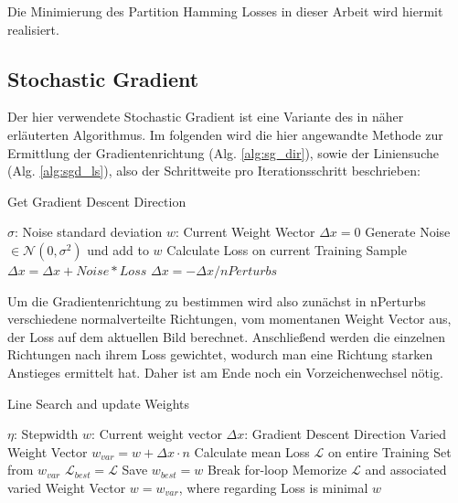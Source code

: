 Die Minimierung des Partition Hamming Losses in dieser Arbeit wird hiermit realisiert.

\subsection{Stochastic Gradient}

Der hier verwendete Stochastic Gradient ist eine Variante des in \cite{NowozinStrucLearn11} näher erläuterten Algorithmus. Im folgenden wird die hier angewandte Methode zur Ermittlung der Gradientenrichtung (Alg. \ref{alg:sg_dir}), sowie der Liniensuche (Alg. \ref{alg:sgd_ls}), also der Schrittweite pro Iterationsschritt beschrieben: \\

\begin{algorithm}
\caption{Get Gradient Descent Direction}\label{alg:sg_dir}
\begin{algorithmic}[1]
	\State $\sigma$: Noise standard deviation
	\State $w$: Current Weight Wector
	\State
	\State $\Delta x = 0$
		\State Generate Noise $\in \mathcal{N}(0, \sigma^2)$ und add to $w$
		\State Calculate Loss on current Training Sample
		\State $\Delta x = \Delta x + Noise*Loss$
	\EndFor
	\State $\Delta x = -\Delta x / nPerturbs$
	\State {}
\EndProcedure
\end{algorithmic}
\end{algorithm}

Um die Gradientenrichtung zu bestimmen wird also zunächst in nPerturbs verschiedene normalverteilte Richtungen, vom momentanen Weight Vector aus, der Loss auf dem aktuellen Bild berechnet. Anschließend werden die einzelnen Richtungen nach ihrem Loss gewichtet, wodurch man eine Richtung starken Anstieges ermittelt hat. Daher ist am Ende noch ein Vorzeichenwechsel nötig.


\begin{algorithm}[H]
\caption{Line Search and update Weights}\label{alg:sgd_ls}
\begin{algorithmic}[1]
	\State $\eta$: Stepwidth
	\State $w$: Current weight vector
	\State $\Delta x$: Gradient Descent Direction
	\State
		\State Varied Weight Vector $w_{var} = w + \Delta x \cdot n$
		\State Calculate mean Loss $\mathcal{L}$ on entire Training Set
		\State from $w_{var}$
			\State $\mathcal{L}_{best} = \mathcal{L}$
			\State Save $w_{best} = w$
			\State Break for-loop
		\EndIf
		\State Memorize $\mathcal{L}$ and associated varied Weight Vector
	\EndFor
	\State $w = w_{var}$, where regarding Loss is minimal
	\State \Return $w$
\EndProcedure
\end{algorithmic}
\end{algorithm}

